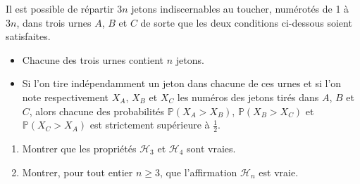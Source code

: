 \documentclass[landscape,twocolumn,leqno,a4paper,10pt]{report} %
\renewcommand{\geq}{\geqslant}
\newcommand{\Prob}{\mathbb{P}}
\begin{document}
\begin{enumerate}
	Il est possible de répartir $3 n$ jetons indiscernables au toucher, numérotés de 1 à $3 n$, dans trois urnes $A$, $B$ et $C$ de sorte que les deux conditions ci-dessous soient satisfaites.
	\begin{itemize}
		\item Chacune des trois urnes contient $n$ jetons.
		\item Si l'on tire indépendamment un jeton dans chacune de ces urnes et si l'on note respectivement $X_{A}$, $X_{B}$ et $X_{C}$ les numéros des jetons tirés dans $A$, $B$ et $C$, alors chacune des probabilités $\Prob\left(X_{A}>X_{B}\right)$, $\Prob\left(X_{B}>X_{C}\right)$ et $\Prob\left(X_{C}>X_{A}\right)$ est strictement supérieure à $\frac{1}{2}$.
	\end{itemize}
	\begin{enumerate}
		\item Montrer que les propriétés $\mathscr{H}_{3}$ et $\mathscr{H}_{4}$ sont vraies.
		\item Montrer, pour tout entier $n \geq 3$, que l'affirmation $\mathscr{H}_{n}$ est vraie.
	\end{enumerate}
\end{enumerate}
\end{document}
